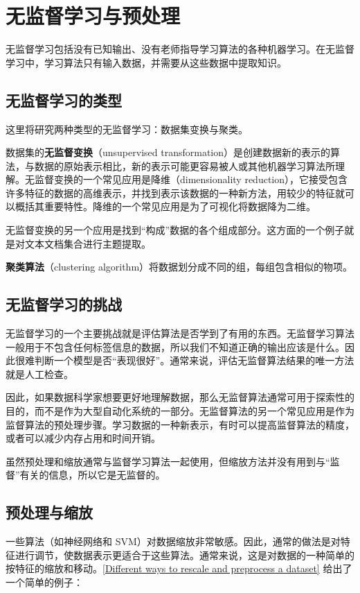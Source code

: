 \chapter{无监督学习与预处理\label{chapter03}}
无监督学习包括没有已知输出、没有老师指导学习算法的各种机器学习。在无监督学习中，学习算法只有输入数据，并需要从这些数据中提取知识。
\section{无监督学习的类型}
这里将研究两种类型的无监督学习：数据集变换与聚类。

数据集的\textbf{无监督变换}（unsupervised transformation）是创建数据新的表示的算法，与数据的原始表示相比，新的表示可能更容易被人或其他机器学习算法所理解。无监督变换的一个常见应用是降维（dimensionality reduction），它接受包含许多特征的数据的高维表示，并找到表示该数据的一种新方法，用较少的特征就可以概括其重要特性。降维的一个常见应用是为了可视化将数据降为二维。

无监督变换的另一个应用是找到“构成”数据的各个组成部分。这方面的一个例子就是对文本文档集合进行主题提取。

\textbf{聚类算法}（clustering algorithm）将数据划分成不同的组，每组包含相似的物项。
\section{无监督学习的挑战}
无监督学习的一个主要挑战就是评估算法是否学到了有用的东西。无监督学习算法一般用于不包含任何标签信息的数据，所以我们不知道正确的输出应该是什么。因此很难判断一个模型是否“表现很好”。通常来说，评估无监督算法结果的唯一方法就是人工检查。

因此，如果数据科学家想要更好地理解数据，那么无监督算法通常可用于探索性的目的，而不是作为大型自动化系统的一部分。无监督算法的另一个常见应用是作为监督算法的预处理步骤。学习数据的一种新表示，有时可以提高监督算法的精度，或者可以减少内存占用和时间开销。

虽然预处理和缩放通常与监督学习算法一起使用，但缩放方法并没有用到与“监督”有关的信息，所以它是无监督的。
\section{预处理与缩放}
一些算法（如神经网络和 SVM）对数据缩放非常敏感。因此，通常的做法是对特征进行调节，使数据表示更适合于这些算法。通常来说，这是对数据的一种简单的按特征的缩放和移动。\autoref{Different ways to rescale and preprocess a dataset} 给出了一个简单的例子：

